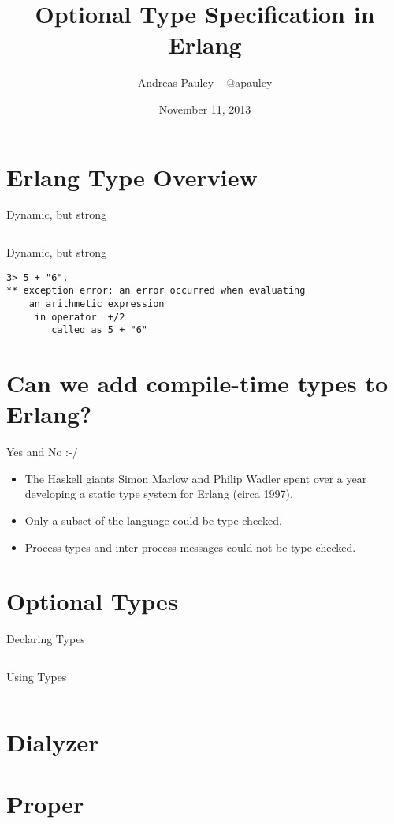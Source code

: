 \documentclass{beamer}
\title[Types in Erlang]{Optional Type Specification in Erlang}
\author{Andreas Pauley -- @apauley}
\institute{Lambda Luminaries -- @lambdaluminary}
\date{November 11, 2013}
\begin{document}
\begin{frame}
  \titlepage
\end{frame}

\section{Erlang Type Overview}

\begin{frame}{Dynamic, but strong}

  \inputminted[firstline=5]{erlang}{src/dynamic.erl}

\end{frame}

\begin{frame}[fragile]{Dynamic, but strong}

  \begin{verbatim}
3> 5 + "6".
** exception error: an error occurred when evaluating
    an arithmetic expression
     in operator  +/2
        called as 5 + "6"
  \end{verbatim}

\end{frame}

\section{Can we add compile-time types to Erlang?}

\begin{frame}{Yes and No :-/}

  \begin{itemize}[<+->]
  \item The Haskell giants Simon Marlow and Philip Wadler spent over a year
    developing a static type system for Erlang (circa 1997).
  \item Only a subset of the language could be type-checked.
  \item Process types and inter-process messages could not be type-checked.
  \end{itemize}

\end{frame}

\section{Optional Types}

\begin{frame}{Declaring Types}

  \inputminted[firstline=4, lastline=6]{erlang}{src/cards.erl}

\end{frame}


\begin{frame}{Using Types}

  \inputminted[firstline=12, lastline=13]{erlang}{src/cards.erl}

\end{frame}


\section{Dialyzer}



\section{Proper}
\end{document}
